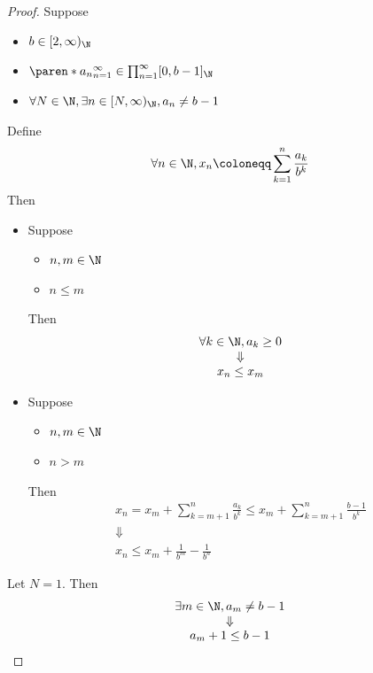 \begin{proof}
  Suppose
  \begin{itemize}
    \item $b \in [2, \infty)_{\N}$
    \item $\paren*{a_{n}}_{n = 1}^{\infty} \in \prod_{n = 1}^{\infty} [0, b - 1]_{\N}$
    \item $\forall N \in \N, \exists n \in [N, \infty)_{\N}, a_{n} \neq b - 1$
  \end{itemize}
  Define
  \[
    \forall n \in \N, x_{n} \coloneqq \sum_{k = 1}^{n} \frac{a_{k}}{b^{k}}
  \]
  Then
  \begin{itemize}
    \item Suppose
          \begin{itemize}
            \item $n, m \in \N$
            \item $n \leq m$
          \end{itemize}
          Then
          \[
            \begin{array}{c}
              \forall k \in \N, a_{k} \geq 0 \\
              \Downarrow                     \\
              x_{n} \leq x_{m}
            \end{array}
          \]
    \item Suppose
          \begin{itemize}
            \item $n, m \in \N$
            \item $n > m$
          \end{itemize}
          Then
          \[
            \begin{array}{c}
              x_{n} = x_{m} + \sum_{k = m + 1}^{n} \frac{a_{k}}{b^{k}}
              \leq x_{m} + \sum_{k = m + 1}^{n} \frac{b - 1}{b^{k}} \\
              \Downarrow                                            \\
              x_{n} \leq x_{m} + \frac{1}{b^{m}} - \frac{1}{b^{n}}
            \end{array}
          \]
  \end{itemize}
  Let $N = 1$. Then
  \[
    \begin{array}{c}
      \exists m \in \N, a_{m} \neq b - 1 \\
      \Downarrow                         \\
      a_{m} + 1 \leq b - 1
    \end{array}
\]
\end{proof}
